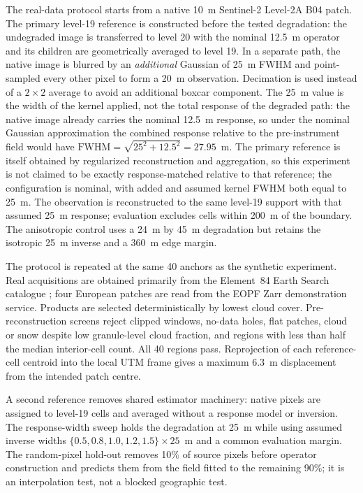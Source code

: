 \documentclass[journal]{IEEEtran}
\begin{document}
The real-data protocol starts from a native 10~m Sentinel-2 Level-2A B04
patch. The primary level-19 reference is constructed before the tested
degradation: the undegraded image is transferred to level 20 with the nominal
12.5~m operator and its children are geometrically averaged to level 19. In a
separate path, the native image is blurred by an \emph{additional} Gaussian
of 25~m FWHM and point-sampled
every other pixel to form a 20~m observation. Decimation is used instead of a
$2\times2$ average to avoid an additional boxcar component. The 25~m value is
the width of the kernel applied, not the total response of the degraded path:
the native image already carries the nominal 12.5~m response, so under the
nominal Gaussian approximation the combined response relative to the
pre-instrument field would have $\mathrm{FWHM}=\sqrt{25^2+12.5^2}=27.95$~m.
The primary reference is itself obtained by regularized reconstruction and
aggregation, so this experiment is not claimed to be exactly
response-matched relative to that reference; the configuration is nominal,
with added and assumed kernel FWHM both equal to 25~m. The observation
is reconstructed to the same level-19 support with that assumed 25~m response;
evaluation excludes cells within 200~m of the boundary. The anisotropic
control uses a 24~m by 45~m degradation but retains the isotropic 25~m inverse
and a 360~m edge margin.

The protocol is repeated at the same 40 anchors as the synthetic experiment.
Real acquisitions are obtained primarily from the Element~84 Earth Search
catalogue \cite{earthsearch}; four European patches are read from the EOPF
Zarr demonstration service. Products are selected deterministically by
lowest cloud cover. Pre-reconstruction screens reject clipped windows,
no-data holes, flat patches, cloud or snow despite low granule-level cloud
fraction, and regions with less than half the median interior-cell count. All
40 regions pass. Reprojection of each reference-cell centroid into the local
UTM frame gives a maximum 6.3~m displacement from the intended patch centre.

A second reference removes shared estimator machinery: native pixels are
assigned to level-19 cells and averaged without a response model or inversion.
The response-width sweep holds the degradation at 25~m while using assumed
inverse widths $\{0.5,0.8,1.0,1.2,1.5\}\times25$~m and a common evaluation
margin. The random-pixel hold-out removes 10\% of source pixels before
operator construction and predicts them from the field fitted to the
remaining 90\%; it is an interpolation test, not a blocked geographic test.
\end{document}
